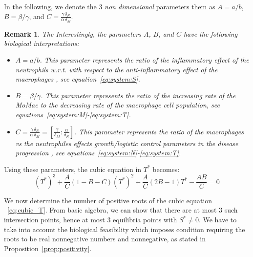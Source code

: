 \documentclass[a4paper, 12pt]{article}
\newtheorem{rem}{Remark}[section]
\providecommand{\DIFaddtex}[1]{{\protect\color{blue} \sf #1}} %
\providecommand{\DIFdeltex}[1]{{\protect\color{red} \scriptsize #1}} %
\providecommand{\DIFaddbegin}{} %
\providecommand{\DIFaddend}{} %
\providecommand{\DIFdelbegin}{} %
\providecommand{\DIFdelend}{} %
\providecommand{\DIFadd}[1]{\texorpdfstring{\DIFaddtex{#1}}{#1}} %
\providecommand{\DIFdel}[1]{\texorpdfstring{\DIFdeltex{#1}}{}} %
\begin{document}
In the following, we denote \DIFdelbegin \DIFdel{the 3 \emph{non dimensional} parameters }\DIFdelend \DIFaddbegin \DIFadd{them }\DIFaddend as $A=a/b$, $B=\beta/\gamma$, and $C=\displaystyle{\frac{\gamma \,\delta_N}{\alpha\,\delta_M}}$.
\begin{rem}
\DIFdelbegin \DIFdel{The }\DIFdelend \DIFaddbegin \DIFadd{Interestingly, the }\DIFaddend parameters $A$, $B$, and $C$ have the following biological interpretations:
\begin{itemize}
    \item $A = a/b$. This parameter represents the ratio of the inflammatory effect of the neutrophils \DIFdelbegin \DIFdel{w.r.t. }\DIFdelend \DIFaddbegin \DIFadd{with respect to }\DIFaddend the anti-inflammatory effect of the macrophages\DIFaddbegin \DIFadd{, see equation~\eqref{eq:system:S}}\DIFaddend .
    \item $B = \beta/\gamma$. This parameter represents the ratio of the increasing rate of the MoMac to the decreasing rate of the macrophage \DIFaddbegin \DIFadd{cell population, see equations~\eqref{eq:system:M}-\eqref{eq:system:T}}\DIFaddend .
    \item $C = \frac{\gamma \,\delta_N}{\alpha\,\delta_M} = \left[\frac{\gamma}{\delta_M} : \frac{\alpha}{\delta_N}\right]$. This parameter represents the ratio of the macrophages vs the neutrophiles \DIFdelbegin \DIFdel{effects }\DIFdelend \DIFaddbegin \DIFadd{growth/logistic control parameters }\DIFaddend in the disease progression\DIFaddbegin \DIFadd{, see equations~\eqref{eq:system:N}-\eqref{eq:system:T}}\DIFaddend .
\end{itemize}   
\end{rem}
Using these parameters, the cubic equation in $T^*$ becomes:
\begin{equation} 
\DIFaddbegin {\DIFaddend \left(T^*\right)\DIFaddbegin }\DIFaddend ^3 +  \frac{A}{C}  \left(1- B- C \right) \DIFaddbegin {\DIFaddend (T^*)\DIFaddbegin }\DIFaddend ^2 + \frac{A}{C} \left(2 B -1 \right) T^* - \frac{A B}{C} = 0
\label{eq:cubic_T}
\end{equation}
\par\noindent We now determine the number of positive roots of the cubic equation\DIFaddbegin \DIFadd{~}\DIFaddend \eqref{eq:cubic_T}.
From basic algebra, we can show that there are at most 3 such intersection points, hence at most 3 equilibria points with $S^* \neq 0$. 
We have to take into account the biological feasibility \DIFdelbegin \DIFdel{which imposes }\DIFdelend \DIFaddbegin \DIFadd{condition requiring }\DIFaddend the roots to be real \DIFdelbegin \DIFdel{nonnegative numbers}\DIFdelend \DIFaddbegin \DIFadd{and nonnegative, as stated in Proposition~\ref{prop:positivity}}\DIFaddend .
\end{document}
